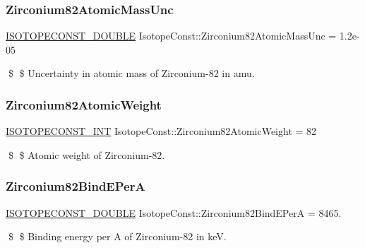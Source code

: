 \subsubsection{\texorpdfstring{Zirconium82\+Atomic\+Mass\+Unc}{Zirconium82AtomicMassUnc}}
{\footnotesize\ttfamily \mbox{\hyperlink{group___isotope_const-_macros_ga8f45a7272ce02c0b4c65c44636ed719a}{I\+S\+O\+T\+O\+P\+E\+C\+O\+N\+S\+T\+\_\+\+D\+O\+U\+B\+LE}} Isotope\+Const\+::\+Zirconium82\+Atomic\+Mass\+Unc = 1.\+2e-\/05}

\$ \$ Uncertainty in atomic mass of Zirconium-\/82 in amu. \mbox{\label{group___isotope_const-_zirconium-_zr82_ga131820ad471dac1b8ff62f6b93953238}} 
\subsubsection{\texorpdfstring{Zirconium82\+Atomic\+Weight}{Zirconium82AtomicWeight}}
{\footnotesize\ttfamily \mbox{\hyperlink{group___isotope_const-_macros_ga5f18360b3e99483a35c32d789e62621c}{I\+S\+O\+T\+O\+P\+E\+C\+O\+N\+S\+T\+\_\+\+I\+NT}} Isotope\+Const\+::\+Zirconium82\+Atomic\+Weight = 82}

\$ \$ Atomic weight of Zirconium-\/82. \mbox{\label{group___isotope_const-_zirconium-_zr82_ga274ebd0cb54b40da207666c2cf84835f}} 
\subsubsection{\texorpdfstring{Zirconium82\+Bind\+E\+PerA}{Zirconium82BindEPerA}}
{\footnotesize\ttfamily \mbox{\hyperlink{group___isotope_const-_macros_ga8f45a7272ce02c0b4c65c44636ed719a}{I\+S\+O\+T\+O\+P\+E\+C\+O\+N\+S\+T\+\_\+\+D\+O\+U\+B\+LE}} Isotope\+Const\+::\+Zirconium82\+Bind\+E\+PerA = 8465.}

\$ \$ Binding energy per A of Zirconium-\/82 in keV. \mbox{\label{group___isotope_const-_zirconium-_zr82_gaf313036e3b26ca0d67d53cb84836bc98}} 
